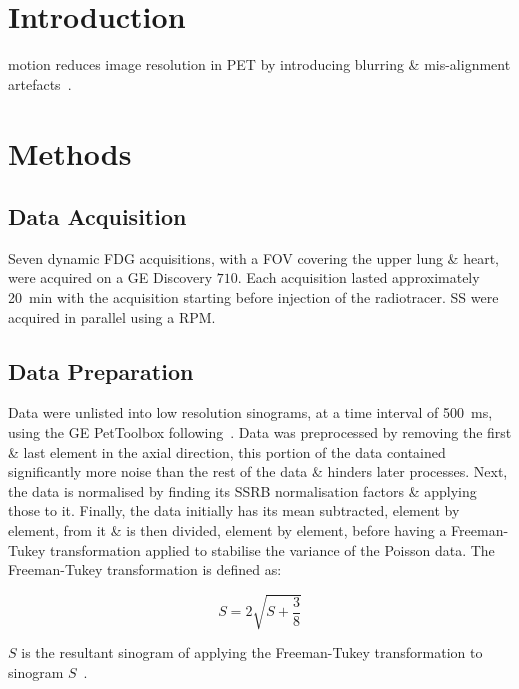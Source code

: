 \section{Introduction} \label{sec:introduction}
     motion reduces image resolution in \gls{PET} by introducing blurring \& mis-alignment artefacts~\cite{Nehmeh2008a}. 

\section{Methods} \label{sec:methods}
\subsection{Data Acquisition} \label{sec:data_acquisition}
        Seven dynamic \gls{FDG} acquisitions, with a \gls{FOV} covering the upper lung \& heart, were acquired on a \gls{GE} Discovery $710$. Each acquisition lasted approximately \SI{20}{\minute} with the acquisition starting before injection of the radiotracer. \gls{SS} were acquired in parallel using a \gls{RPM}.
        
    \subsection{Data Preparation} \label{sec:data_preparation}
        Data were unlisted into low resolution sinograms, at a time interval of \SI{500}{\milli\second}, using the \gls{GE} PetToolbox following~\cite{Bertolli2018Data-DrivenTomography}. Data was preprocessed by removing the first \& last element in the axial direction, this portion of the data contained significantly more noise than the rest of the data \& hinders later processes. Next, the data is normalised by finding its \gls{SSRB} normalisation factors \& applying those to it. Finally, the data initially has its mean subtracted, element by element, from it \& is then divided, element by element, before having a Freeman-Tukey transformation applied to stabilise the variance of the Poisson data. The Freeman-Tukey transformation is defined as:
        
        \begin{equation}
            S = 2 \sqrt{S + \frac{3}{8}}
        \end{equation}
        
        \noindent $S$ is the resultant sinogram of applying the Freeman-Tukey transformation to sinogram $S$~\cite{Freeman1950TransformationsRoot}.
    
